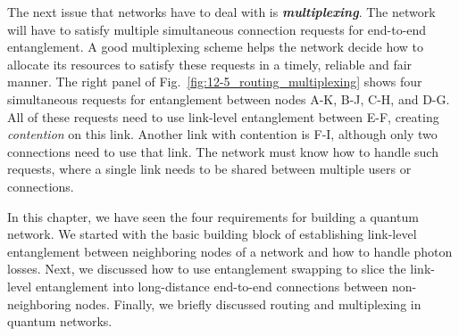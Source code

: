 The next issue that networks have to deal with is \textit{\textbf{multiplexing}}.
The network will have to satisfy multiple simultaneous connection requests for end-to-end entanglement.
A good multiplexing scheme helps the network decide how to allocate its resources to satisfy these requests in a timely, reliable and fair manner.
The right panel of Fig.~\ref{fig:12-5_routing_multiplexing} shows four simultaneous requests for entanglement between nodes A-K, B-J, C-H, and D-G.
All of these requests need to use link-level entanglement between E-F, creating \emph{contention} on this link.
Another link with contention is F-I, although only two connections need to use that link.
The network must know how to handle such requests, where a single link needs to be shared between multiple users or connections.

In this chapter, we have seen the four requirements for building a quantum network.
We started with the basic building block of establishing link-level entanglement between neighboring nodes of a network and how to handle photon losses.
Next, we discussed how to use entanglement swapping to slice the link-level entanglement into long-distance end-to-end connections between non-neighboring nodes.
Finally, we briefly discussed routing and multiplexing in quantum networks.

\newpage
\begin{exercises}


\end{exercises}

